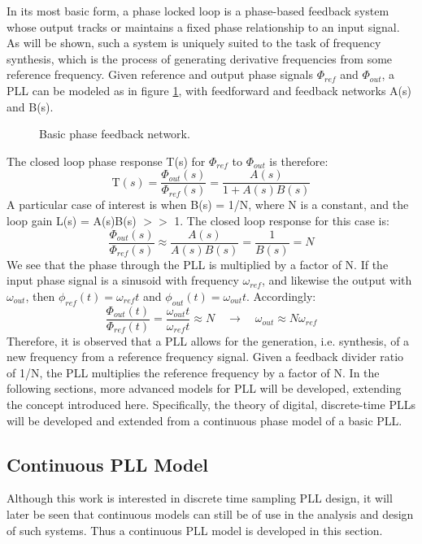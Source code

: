 
	In its most basic form, a phase locked loop is a phase-based feedback system whose output tracks or maintains a fixed phase relationship to an input signal. As will be shown, such a system is uniquely suited to the task of frequency synthesis, which is the process of generating derivative frequencies from some reference frequency. Given reference and output phase signals $\Phi_{ref}$ and $\Phi_{out}$, a PLL can be modeled as in figure \ref{fig:basic_fb}, with feedforward and feedback networks A(s) and B(s). 
	\begin{figure}[htb!]
		\center
		\caption{Basic phase feedback network.}
		\label{fig:basic_fb}
	\end{figure}
	\FloatBarrier
	The closed loop phase response T(s) for $\Phi_{ref}$ to $\Phi_{out}$ is therefore:
	\begin{equation}
		\mathrm{T}(s) = \frac{\Phi_{out}(s)}{\Phi_{ref}(s)} = \frac{A(s)}{1+A(s)B(s)}
	\end{equation}
	A particular case of interest is when B(s) = 1/N, where N is a constant, and the loop gain L(s) = A(s)B(s) $>>$ 1. The closed loop response for this case is:
	\begin{equation}\label{mult_by_n}
		\frac{\Phi_{out}(s)}{\Phi_{ref}(s)} \approx \frac{A(s)}{A(s)B(s)} = \frac{1}{B(s)} = N
	\end{equation}
	We see that the phase through the PLL is multiplied by a factor of N. If the input phase signal is a sinusoid with frequency $\omega_{ref}$, and likewise the output with $\omega_{out}$, then $\phi_{ref}(t)=\omega_{ref}t$ and $\phi_{out}(t)=\omega_{out}t$. Accordingly:
	\begin{equation}
		\frac{\Phi_{out}(t)}{\Phi_{ref}(t)} = \frac{\omega_{out}t}{\omega_{ref}t} \approx N \hspace{1em} \rightarrow \hspace{1em} \omega_{out} \approx N\omega_{ref}
	\end{equation}
	Therefore, it is observed that a PLL allows for the generation, i.e. synthesis, of a new frequency from a reference frequency signal. Given a feedback divider ratio of 1/N, the PLL multiplies the reference frequency by a factor of N. In the following sections, more advanced models for PLL will be developed, extending the concept introduced here. Specifically, the theory of digital, discrete-time PLLs will be developed and extended from a continuous phase model of a basic PLL.

	\subsection{Continuous PLL Model}
		Although this work is interested in discrete time sampling PLL design, it will later be seen that continuous models can still be of use in the analysis and design of such systems. Thus a continuous PLL model is developed in this section.

